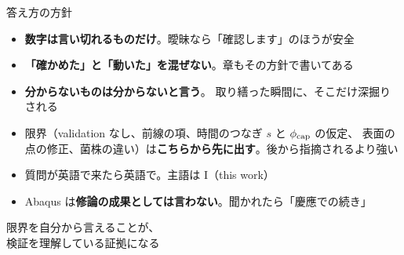 \documentclass[aspectratio=169,11pt]{beamer}
\begin{document}
\begin{frame}{答え方の方針}
\vspace{4pt}
\begin{itemize}\small
  \item \textbf{数字は言い切れるものだけ}。曖昧なら「確認します」のほうが安全
  \item \textbf{「確かめた」と「動いた」を混ぜない}。章もその方針で書いてある
  \item \textbf{分からないものは分からないと言う}。
        取り繕った瞬間に、そこだけ深掘りされる
  \item 限界（validation なし、前線の項、時間のつなぎ $s$ と $\phi_{\rm cap}$ の仮定、
        表面の点の修正、菌株の違い）は\textbf{こちらから先に出す}。後から指摘されるより強い
  \item 質問が英語で来たら英語で。主語は I（this work）
  \item Abaqus は\textbf{修論の成果としては言わない}。聞かれたら「慶應での続き」
\end{itemize}
\vspace{8pt}
\begin{center}
\colorbox{c3!10}{\parbox{0.86\linewidth}{\centering\small
限界を自分から言えることが、\\
検証を理解している証拠になる}}
\end{center}
\end{frame}
\end{document}
